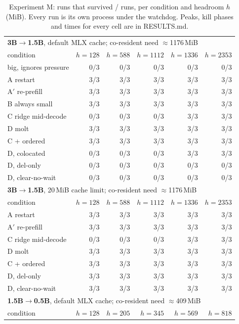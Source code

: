 \begin{table}[t]\centering\small\setlength{\tabcolsep}{4pt}\caption{Experiment M: runs that survived / runs, per condition and headroom $h$ (MiB). Every run is its own process under the watchdog. Peaks, kill phases and times for every cell are in RESULTS.md.}\label{tab:memory}
\begin{tabular}{lrrrrr}\toprule
\multicolumn{6}{l}{\textbf{3B$\to$1.5B}, default MLX cache; co-resident need $\approx$1176\,MiB} \\
condition & $h=128$ & $h=588$ & $h=1112$ & $h=1336$ & $h=2353$ \\ \midrule
big, ignores pressure & 0/3 & 0/3 & 0/3 & 0/3 & 0/3 \\
A restart & 3/3 & 3/3 & 3/3 & 3/3 & 3/3 \\
A$'$ re-prefill & 3/3 & 3/3 & 3/3 & 3/3 & 3/3 \\
B always small & 3/3 & 3/3 & 3/3 & 3/3 & 3/3 \\
C ridge mid-decode & 0/3 & 0/3 & 0/3 & 3/3 & 3/3 \\
D molt & 3/3 & 3/3 & 3/3 & 3/3 & 3/3 \\
C + ordered & 3/3 & 3/3 & 3/3 & 3/3 & 3/3 \\
D, colocated & 0/3 & 0/3 & 0/3 & 3/3 & 3/3 \\
D, del-only & 0/3 & 0/3 & 0/3 & 0/3 & 0/3 \\
D, clear-no-wait & 0/3 & 0/3 & 0/3 & 0/3 & 0/3 \\
\midrule
\multicolumn{6}{l}{\textbf{3B$\to$1.5B}, 20\,MiB cache limit; co-resident need $\approx$1176\,MiB} \\
condition & $h=128$ & $h=588$ & $h=1112$ & $h=1336$ & $h=2353$ \\ \midrule
A restart & 3/3 & 3/3 & 3/3 & 3/3 & 3/3 \\
A$'$ re-prefill & 3/3 & 3/3 & 3/3 & 3/3 & 3/3 \\
C ridge mid-decode & 0/3 & 0/3 & 0/3 & 3/3 & 3/3 \\
D molt & 3/3 & 3/3 & 3/3 & 3/3 & 3/3 \\
C + ordered & 3/3 & 3/3 & 3/3 & 3/3 & 3/3 \\
D, del-only & 3/3 & 3/3 & 3/3 & 3/3 & 3/3 \\
D, clear-no-wait & 3/3 & 3/3 & 3/3 & 3/3 & 3/3 \\
\midrule
\multicolumn{6}{l}{\textbf{1.5B$\to$0.5B}, default MLX cache; co-resident need $\approx$409\,MiB} \\
condition & $h=128$ & $h=205$ & $h=345$ & $h=569$ & $h=818$ \\ \midrule

\end{tabular}
\end{table}
